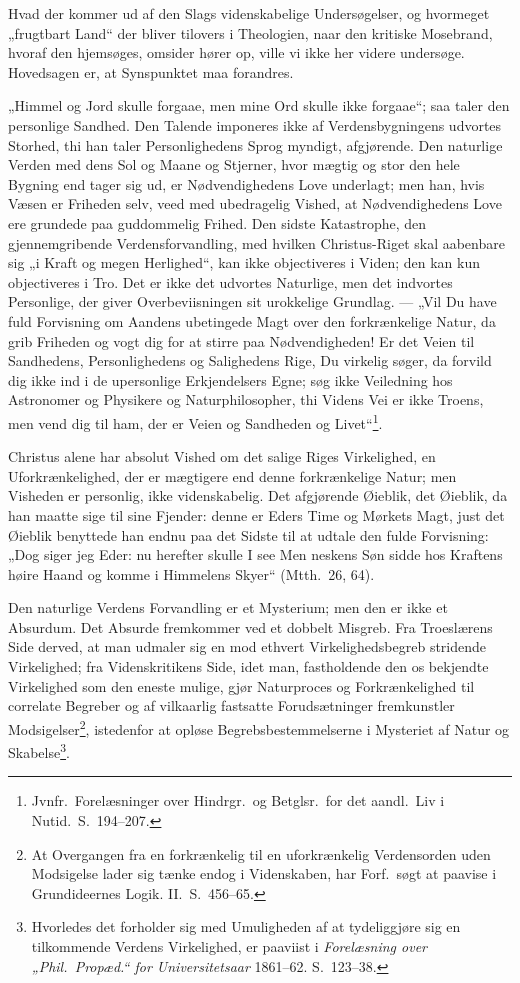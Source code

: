 \documentclass[12pt]{book}
\begin{document}
Hvad der kommer ud af den Slags videnskabelige Undersøgelser, og
hvormeget „frugtbart Land“ der bliver tilovers i Theologien, naar
den kritiske Mosebrand, hvoraf den hjemsøges, omsider hører op,
ville vi ikke her videre undersøge. Hovedsagen er, at Synspunktet
maa forandres.

„Himmel og Jord skulle forgaae, men mine Ord skulle ikke forgaae“;
saa taler den personlige Sandhed. Den Talende imponeres ikke af
Verdensbygningens udvortes Storhed, thi han taler Personlighedens
Sprog myndigt, afgjørende. Den naturlige Verden med dens Sol og
Maane og Stjerner, hvor mægtig og stor den hele Bygning end tager
sig ud, er Nødvendighedens Love underlagt; men han, hvis Væsen er
Friheden selv, veed med ubedragelig Vished, at Nødvendighedens Love
ere grundede paa guddommelig Frihed. Den sidste Katastrophe, den
gjennemgribende Verdensforvandling, med hvilken Christus-Riget skal
aabenbare sig „i Kraft og megen Herlighed“, kan ikke objectiveres i
Viden; den kan kun objectiveres i Tro. Det er ikke det udvortes
Naturlige, men det indvortes Personlige, der giver Overbeviisningen
sit urokkelige Grundlag. --- „Vil Du have fuld Forvisning om Aandens
ubetingede Magt over den forkrænkelige Natur, da grib Friheden og
vogt dig for at stirre paa Nødvendigheden! Er det Veien til
Sandhedens, Personlighedens og Salighedens Rige, Du virkelig søger,
da forvild dig ikke ind i de upersonlige Erkjendelsers Egne; søg
ikke Veiledning hos Astronomer og Physikere og Naturphilosopher, thi
Videns Vei er ikke Troens, men vend dig til ham, der er Veien og
Sandheden og Livet“\footnote{Jvnfr.\ Forelæsninger over Hindrgr.\ og
Betglsr.\ for det aandl.\ Liv i Nutid.\ S.\ 194--207.}.

Christus alene har absolut Vished om det salige Riges Virkelighed,
en Uforkrænkelighed, der er mægtigere end denne forkrænkelige Natur;
men Visheden er personlig, ikke videnskabelig. Det afgjørende
Øieblik, det Øieblik, da han maatte sige til sine Fjender: denne er
Eders Time og Mørkets Magt, just det Øieblik benyttede han endnu paa
det Sidste til at udtale den fulde Forvisning: „Dog siger jeg Eder:
nu herefter skulle I see Men\-
neskens Søn sidde hos Kraftens høire Haand og komme i Himmelens
Skyer“ (Mtth.\ 26, 64).

Den naturlige Verdens Forvandling er et Mysterium; men den er ikke
et Absurdum. Det Absurde fremkommer ved et dobbelt Misgreb. Fra
Troeslærens Side derved, at man udmaler sig en mod ethvert
Virkelighedsbegreb stridende Virkelighed; fra Videnskritikens Side,
idet man, fastholdende den os bekjendte Virkelighed som den eneste
mulige, gjør Naturproces og Forkrænkelighed til correlate Begreber
og af vilkaarlig fastsatte Forudsætninger fremkunstler
Modsigelser\footnote{At Overgangen fra en forkrænkelig til en
uforkrænkelig Verdensorden uden Modsigelse lader sig tænke endog i
Videnskaben, har Forf.\ søgt at paavise i Grundideernes Logik.
II.\ S.\ 456--65.}, istedenfor at opløse Begrebsbestemmelserne i
Mysteriet af Natur og Skabelse\footnote{Hvorledes det forholder sig
med Umuligheden af at tydeliggjøre sig en tilkommende Verdens
Virkelighed, er paaviist i \emph{Forelæsning over „Phil.\ Propæd.“
for Universitetsaar} 1861--62. S.\ 123--38.}.
\end{document}
